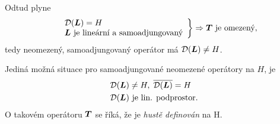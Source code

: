 Odtud plyne 
 \begin{equation*}
    \begin{split}
        \left.
    \begin{array}{ll}
        &\mathcal{D}(\boldsymbol{L})=H\\
        &\boldsymbol{L} \text{ je lineární a samoadjungovaný}
    \end{array}
        \right \} \Rightarrow \boldsymbol{T} \text{ je omezený},
    \end{split}
\end{equation*}
tedy neomezený, samoadjungovaný operátor má $\mathcal{D}(\boldsymbol{L})\neq H$.

Jediná možná situace pro samoadjungované neomezené operátory na $H$, je
\begin{align*}
    &\mathcal{D}(\boldsymbol{L})\neq H,\; \overline{\mathcal{D}(\boldsymbol{L})}=H\\
    &\mathcal{D}(\boldsymbol{L}) \text{ je lin. podprostor}.
\end{align*}
O takovém operátoru $\boldsymbol{T}$ se říká, že je \emph{hustě definován} na H.

